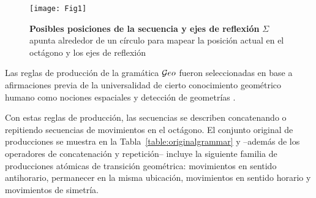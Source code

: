 \begin{figure}[!ht]
   \texttt{[image: Fig1]}
   \caption{{\bf Posibles posiciones de la secuencia y ejes de reflexión} $\Sigma$ apunta alrededor de un círculo para mapear la posición actual en el octágono y los ejes de reflexión}\label{fig:circle}
\end{figure}


Las reglas de producción de la gramática $\mathcal Geo$ fueron seleccionadas en base a afirmaciones previa de la universalidad de cierto conocimiento geométrico humano \cite{izard2011geometry,dehaene2006core,dillon2013core} como nociones espaciales \cite{landau1981spatial,lee2012navigation} y detección de geometrías \cite{westphal2012production,machilsen2009role}.


Con estas reglas de producción, las secuencias se describen concatenando o repitiendo secuencias de movimientos en el octágono. El conjunto original de producciones se muestra en la Tabla~\ref{table:originalgrammar} y --además de los operadores de concatenación y repetición-- incluye la siguiente familia de producciones atómicas de transición geométrica: movimientos en sentido antihorario, permanecer en la misma ubicación, movimientos en sentido horario y movimientos de simetría.

